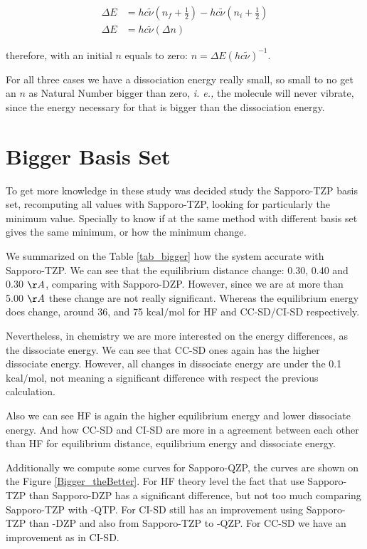 \begin{align*}
\Delta E &= hc\tilde{\nu} \left(n_f +\frac12\right) - hc\tilde{\nu} \left(n_i +\frac12\right) \\\nonumber
\Delta E &= hc\tilde{\nu} (\Delta n) \nonumber
\end{align*}

\noindent therefore, with an initial $n$ equals to zero: $n=\Delta E(hc\tilde{\nu})^{-1}$.

For all three cases we have a dissociation energy really small, so small
to no get an $n$ as Natural Number bigger than zero, \textit{i. e.,}
the molecule will never vibrate, since the energy necessary for that
is bigger than the dissociation energy.

\section{\textbf{Bigger Basis Set}}

To get more knowledge in these study was decided study the Sapporo-TZP basis
set, recomputing all values  with Sapporo-TZP, looking for particularly the
minimum value. Specially to know if at the same method with different basis
set gives the same minimum, or how the minimum change.

We summarized on the Table \ref{tab_bigger} how the system accurate with
Sapporo-TZP. We can see that the equilibrium distance change: 0.30, 0.40 and
0.30 $\AA$, comparing with Sapporo-DZP. However, since we are at more than 5.00
$\AA$ these change are not really significant. Whereas the equilibrium energy
does change, around 36, and 75 $\mathrm{kcal/mol}$ for HF and CC-SD/CI-SD
respectively.

Nevertheless, in chemistry we are more interested on the energy differences,
as the dissociate energy. We can see that CC-SD ones again
has the higher dissociate energy. However, all changes in dissociate energy are
under the 0.1 $\mathrm{kcal/mol}$, not meaning a significant difference with
respect the previous calculation.

Also we can see HF is again the higher equilibrium energy and lower dissociate
energy. And how CC-SD and CI-SD are more in a agreement between each other than
HF for equilibrium distance, equilibrium energy and dissociate energy.

Additionally we compute some curves for Sapporo-QZP, the curves are shown on
the Figure \ref{Bigger_theBetter}. For HF theory level the fact that use Sapporo-TZP than
Sapporo-DZP has a significant difference, but not too much comparing Sapporo-TZP with -QTP.
For CI-SD still has an improvement using Sapporo-TZP than -DZP and also
from Sapporo-TZP to -QZP. For CC-SD we have an improvement as in
CI-SD. 


